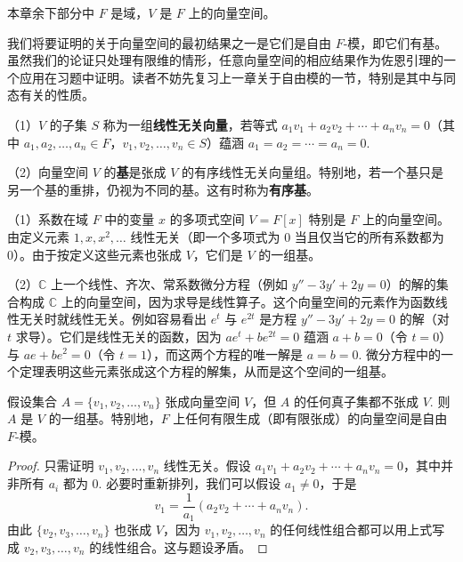 本章余下部分中 \(F\) 是域，\(V\) 是 \(F\) 上的向量空间。

我们将要证明的关于向量空间的最初结果之一是它们是自由 \(F\)-模，即它们有基。虽然我们的论证只处理有限维的情形，任意向量空间的相应结果作为佐恩引理的一个应用在习题中证明。读者不妨先复习上一章关于自由模的一节，特别是其中与同态有关的性质。

\begin{definition}
（1）\(V\) 的子集 \(S\) 称为一组\textbf{线性无关向量}，若等式 \(a_1v_1+a_2v_2+\cdots+a_nv_n = 0\)（其中 \(a_1, a_2, \ldots, a_n \in F\)，\(v_1, v_2, \ldots, v_n \in S\)）蕴涵 \(a_1 = a_2 = \cdots = a_n = 0\).

（2）向量空间 \(V\) 的\textbf{基}是张成 \(V\) 的有序线性无关向量组。特别地，若一个基只是另一个基的重排，仍视为不同的基。这有时称为\textbf{有序基}。
\end{definition}

\begin{example}
（1）系数在域 \(F\) 中的变量 \(x\) 的多项式空间 \(V = F[x]\) 特别是 \(F\) 上的向量空间。由定义元素 \(1, x, x^2, \ldots\) 线性无关（即一个多项式为 0 当且仅当它的所有系数都为 0）。由于按定义这些元素也张成 \(V\)，它们是 \(V\) 的一组基。

（2）\(\mathbb{C}\) 上一个线性、齐次、常系数微分方程（例如 \(y''-3y'+2y = 0\)）的解的集合构成 \(\mathbb{C}\) 上的向量空间，因为求导是线性算子。这个向量空间的元素作为函数线性无关时就线性无关。例如容易看出 \(e^t\) 与 \(e^{2t}\) 是方程 \(y''-3y'+2y = 0\) 的解（对 \(t\) 求导）。它们是线性无关的函数，因为 \(ae^t+be^{2t} = 0\) 蕴涵 \(a+b = 0\)（令 \(t = 0\)）与 \(ae+be^2 = 0\)（令 \(t = 1\)），而这两个方程的唯一解是 \(a = b = 0\). 微分方程中的一个定理表明这些元素张成这个方程的解集，从而是这个空间的一组基。
\end{example}

\begin{proposition}\label{pro:11.1}
假设集合 \(A = \{v_1, v_2, \ldots, v_n\}\) 张成向量空间 \(V\)，但 \(A\) 的任何真子集都不张成 \(V\). 则 \(A\) 是 \(V\) 的一组基。特别地，\(F\) 上任何有限生成（即有限张成）的向量空间是自由 \(F\)-模。
\end{proposition}

\begin{proof}
只需证明 \(v_1, v_2, \ldots, v_n\) 线性无关。假设 \(a_1v_1+a_2v_2+\cdots+a_nv_n = 0\)，其中并非所有 \(a_i\) 都为 0. 必要时重新排列，我们可以假设 \(a_1 \neq 0\)，于是
\[
v_1 = \frac{1}{a_1}(a_2v_2+\cdots+a_nv_n).
\]
由此 \(\{v_2, v_3, \ldots, v_n\}\) 也张成 \(V\)，因为 \(v_1, v_2, \ldots, v_n\) 的任何线性组合都可以用上式写成 \(v_2, v_3, \ldots, v_n\) 的线性组合。这与题设矛盾。
\end{proof}

